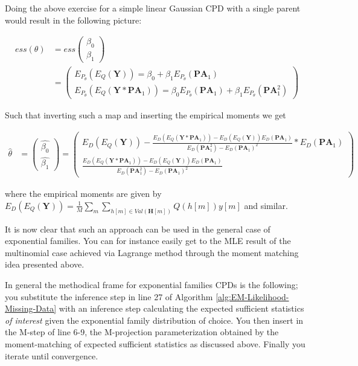 \documentclass[11pt]{article}
\begin{document}
\begin{article}
Doing the above exercise for a simple linear Gaussian CPD with a
single parent would result in the following picture:

 \begin{align*}
 ess (\theta) &= ess\begin{pmatrix}
                 \beta_0\\
		 \beta_1
		 \end{pmatrix} \\
		 &= \begin{pmatrix}
		 E_{P_\theta}(E_Q(\textbf{Y})) = \beta_0 + \beta_1 E_{P_\theta}(\textbf{PA}_1) \\
		 E_{P_\theta}(E_Q(\textbf{Y} * \textbf{PA}_1)) = \beta_0 E_{P_\theta}(\textbf{PA}_1) + \beta_1 E_{P_\theta}(\textbf{PA}_1^2)
		 \end{pmatrix}
\end{align*}


Such that inverting such a map and inserting the empirical moments
we get

 \begin{align}
 \hat{\theta} &= \begin{pmatrix}
                 \hat{\beta_0}\\
		 \hat{\beta_1}
           \end{pmatrix} 
        = \begin{pmatrix}
		 E_D(E_Q(\textbf{Y})) - \frac{E_D(E_Q(\textbf{Y}*\textbf{PA}_1))- E_D(E_Q(\textbf{Y}))E_D(\textbf{PA}_1)}{E_D(\textbf{PA}_1^2) - E_D(\textbf{PA}_1)^2} * E_D(\textbf{PA}_1)\\
		 \frac{E_D(E_Q(\textbf{Y}*\textbf{PA}_1))- E_D(E_Q(\textbf{Y}))E_D(\textbf{PA}_1)}{E_D(\textbf{PA}_1^2) - E_D(\textbf{PA}_1)^2}
           \end{pmatrix}
\end{align}

where the empirical moments are given by \(E_D(E_Q(\textbf{Y})) = \frac{1}{M}
    \sum_m \sum_{h[m] \in Val(\textbf{H}[m])} Q(h[m]) y[m]\) and
similar.    

It is now clear that such an approach can be used in the general
case of exponential families. You can for instance easily get to
the MLE result of the multinomial case achieved via Lagrange method
through the moment matching idea presented above.

In general the methodical frame for exponential families CPDs is
the following; you substitute the inference step in line 27 of
Algorithm \ref{alg:EM-Likelihood-Missing-Data} with an inference step
calculating the expected sufficient statistics \emph{of interest} given
the exponential family distribution of choice. You then insert in
the M-step of line 6-9, the M-projection parameterization obtained
by the moment-matching of expected sufficient statistics as
discussed above. Finally you iterate until convergence.


\end{article}
\end{document}
